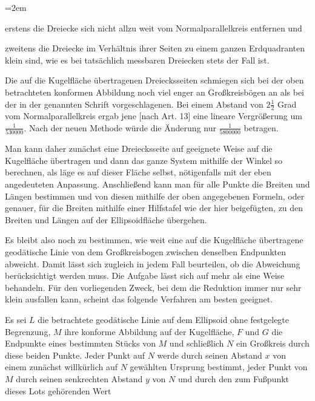 \begin{list}{}{\leftmargin=2em\rightmargin=0pt\itemindent=0pt\itemsep=0pt\parsep=0pt}
\item erstens die Dreiecke sich nicht allzu weit vom Normalparallelkreis entfernen und
\item zweitens die Dreiecke im Verhältnis ihrer Seiten zu einem ganzen Erdquadranten klein sind, wie es bei tatsächlich messbaren Dreiecken stets der Fall ist.
\end{list}
\noindent\hspace*{\parindent}Die auf die Kugelfläche übertragenen Dreiecksseiten schmiegen sich bei der oben betrachteten konformen Abbildung noch viel enger an Großkreisbögen an als bei der in der genannten Schrift vorgeschlagenen. Bei einem Abstand von \(2\tfrac{1}{2}\) Grad vom Normalparallelkreis ergab jene [nach Art. 13] eine lineare Vergrößerung um \(\tfrac{1}{530000}\). Nach der neuen Methode würde die Änderung nur \(\tfrac{1}{5800000}\) betragen.

Man kann daher zunächst eine Dreiecksseite auf geeignete Weise auf die Kugelfläche übertragen und dann das ganze System mithilfe der Winkel so berechnen, als läge es auf dieser Fläche selbst, nötigenfalls mit der eben angedeuteten Anpassung. Anschließend kann man für alle Punkte die Breiten und Längen bestimmen und von diesen mithilfe der oben angegebenen Formeln, oder genauer, für die Breiten mithilfe einer Hilfstafel wie der hier beigefügten, zu den Breiten und Längen auf der Ellipsoidfläche übergehen.

\indent Es bleibt also noch zu bestimmen, wie weit eine auf die Kugelfläche übertragene geodätische Linie von dem Großkreisbogen zwischen denselben Endpunkten abweicht. Damit lässt sich zugleich in jedem Fall beurteilen, ob die Abweichung berücksichtigt werden muss. Die Aufgabe lässt sich auf mehr als eine Weise behandeln. Für den vorliegenden Zweck, bei dem die Reduktion immer nur sehr klein ausfallen kann, scheint das folgende Verfahren am besten geeignet.

Es sei \(L\) die betrachtete geodätische Linie auf dem Ellipsoid ohne festgelegte Begrenzung, \(M\) ihre konforme Abbildung auf der Kugelfläche, \(F\) und \(G\) die Endpunkte eines bestimmten Stücks von \(M\) und schließlich \(N\) ein Großkreis durch diese beiden Punkte. Jeder Punkt auf \(N\) werde durch seinen Abstand \(x\) von einem zunächst willkürlich auf \(N\) gewählten Ursprung bestimmt, jeder Punkt von \(M\) durch seinen senkrechten Abstand \(y\) von \(N\) und durch den zum Fußpunkt dieses Lots gehörenden Wert
